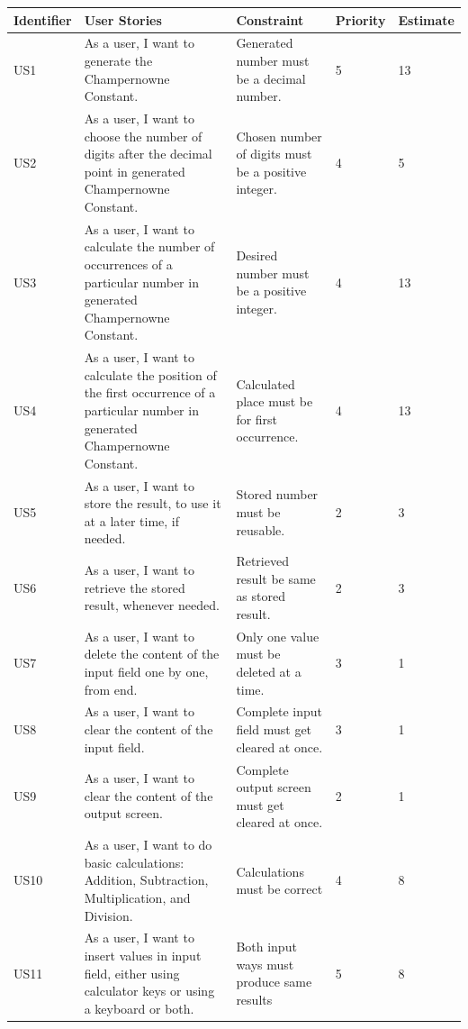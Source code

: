 \documentclass[paper=a4, fontsize=11pt]{report}
\numberwithin{equation}{section}		%
\numberwithin{figure}{section}			%
\numberwithin{table}{section}				%
\begin{document}
\begin{center}
\begin{tabular}{| m{1.3cm} | m{27em} | m{4cm}| m{1.2cm} | m{1.2cm} |} 
\hline
Identifier & User Stories & Constraint & Priority & Estimate \\ [0.7ex]
\hline\hline
US1 & As a user, I want to generate the Champernowne Constant. & Generated number must be a decimal number. & 5 & 13 \\ 
\hline
US2 & As a user, I want to choose the number of digits after the decimal point in generated Champernowne Constant. & Chosen number of digits must be a positive integer. & 4 & 5 \\ 
\hline
US3 & As a user, I want to calculate the number of occurrences of a particular number in generated Champernowne Constant. & Desired number must be a positive integer. & 4 & 13 \\ 
\hline
US4 & As a user, I want to calculate the position of the first occurrence of a particular number in generated Champernowne Constant. & Calculated place must be for first occurrence. & 4 & 13 \\ 
\hline
US5 & As a user, I want to store the result, to use it at a later time, if needed. & Stored number must be reusable. & 2 & 3 \\ 
\hline
US6 & As a user, I want to retrieve the stored result, whenever needed. & Retrieved result be same as stored result. & 2 & 3 \\ 
\hline
US7 & As a user, I want to delete the content of the input field one by one, from end. & Only one value must be deleted at a time. & 3 & 1 \\ 
\hline
US8 & As a user, I want to clear the content of the input field. & Complete input field must get cleared at once. & 3 & 1 \\ 
\hline
US9 & As a user, I want to clear the content of the output screen. & Complete output screen must get cleared at once. & 2 & 1 \\ 
\hline
US10 & As a user, I want to do basic calculations: Addition, Subtraction, Multiplication, and Division. & Calculations must be correct & 4 & 8 \\ 
\hline
US11 & As a user, I want to insert values in input field, either using calculator keys or using a keyboard or both. & Both input ways must produce same results  & 5 & 8 \\ 
\hline
\end{tabular}
\end{center}
\end{document}
